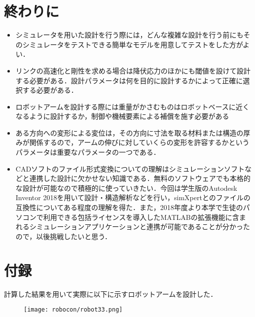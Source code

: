 \documentclass[10pt,b5paper,papersize,dvipdfmx]{jsbook}
\begin{document}
\section{終わりに}
\begin{itemize}
\item シミュレータを用いた設計を行う際には，どんな複雑な設計を行う前にもそのシミュレータをテストできる簡単なモデルを用意してテストをした方がよい．
\item リンクの高速化と剛性を求める場合は降伏応力のほかにも閾値を設けて設計する必要がある．設計パラメータは何を目的に設計するかによって正確に選択する必要がある．
\item ロボットアームを設計する際には重量がかさむものはロボットベースに近くなるように設計するか，制御や機械要素による補償を施す必要がある
\item ある方向への変形による変位は，その方向に寸法を取る材料または構造の厚みが関係するので，アームの伸びに対していくらの変形を許容するかというパラメータは重要なパラメータの一つである．
\item CADソフトのファイル形式変換についての理解はシミュレーションソフトなどと連携した設計に欠かせない知識である．無料のソフトウェアでも本格的な設計が可能なので積極的に使っていきたい．今回は学生版のAutodesk Inventor 2018を用いて設計・構造解析などを行い，simXpertとのファイルの互換性についてある程度の理解を得た．また，2018年度より本学で生徒のパソコンで利用できる包括ライセンスを導入したMATLABの拡張機能に含まれるシミュレーションアプリケーションと連携が可能であることが分かったので，以後挑戦したいと思う．
\end{itemize}

\section{付録}
計算した結果を用いて実際に以下に示すロボットアームを設計した．
\begin{figure}[H]
  \centering
  \texttt{[image: robocon/robot33.png]}
\end{figure}


\end{document}
